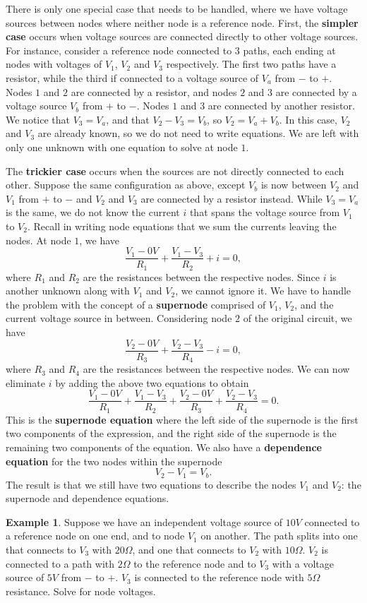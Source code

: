 \documentclass[11pt]{article}
\theoremstyle{plain} %
\theoremstyle{definition}
\theoremstyle{example}
\newtheorem*{example}{Example}
\theoremstyle{remark}
\begin{document}
There is only one special case that needs to be handled, where we have voltage sources between nodes where neither node is a reference node. First, the \textbf{simpler case} occurs when voltage sources are connected directly to other voltage sources. For instance, consider a reference node connected to 3 paths, each ending at nodes with voltages of $V_1$, $V_2$ and $V_3$ respectively. The first two paths have a resistor, while the third if connected to a voltage source of $V_a$ from $-$ to $+$. Nodes $1$ and $2$ are connected by a resistor, and nodes $2$ and $3$ are connected by a voltage source $V_b$ from $+$ to $-$. Nodes $1$ and $3$ are connected by another resistor. We notice that $V_3 = V_a$, and that $V_2-V_3 = V_b$, so $V_2 = V_a + V_b$. In this case, $V_2$ and $V_3$ are already known, so we do not need to write equations. We are left with only one unknown with one equation to solve at node $1$. 

The \textbf{trickier case} occurs when the sources are not directly connected to each other. Suppose the same configuration as above, except $V_b$ is now between $V_2$ and $V_1$ from $+$ to $-$ and $V_2$ and $V_3$ are connected by a resistor instead. While $V_3 = V_a$ is the same, we do not know the current $i$ that spans the voltage source from $V_1$ to $V_2$. Recall in writing node equations that we sum the currents leaving the nodes. At node $1$, we have 
$$\frac{V_1-0V}{R_1} + \frac{V_1-V_3}{R_2} + i = 0,$$
where $R_1$ and $R_2$ are the resistances between the respective nodes. Since $i$ is another unknown along with $V_1$ and $V_2$, we cannot ignore it. We have to handle the problem with the concept of a \textbf{supernode} comprised of $V_1$, $V_2$, and the current voltage source in between. Considering node $2$ of the original circuit, we have 
$$\frac{V_2-0V}{R_3} + \frac{V_2-V_3}{R_4} - i = 0,$$
where $R_3$ and $R_4$ are the resistances between the respective nodes. We can now eliminate $i$ by adding the above two equations to obtain 
$$\frac{V_1-0V}{R_1} + \frac{V_1-V_3}{R_2} +\frac{V_2-0V}{R_3} + \frac{V_2-V_3}{R_4}=0.$$
This is the \textbf{supernode equation} where the left side of the supernode is the first two components of the expression, and the right side of the supernode is the remaining two components of the equation. We also have a \textbf{dependence equation} for the two nodes within the supernode
$$V_2-V_1 = V_b.$$
The result is that we still have two equations to describe the nodes $V_1$ and $V_2$: the supernode and dependence equations. 

\begin{example}
Suppose we have an independent voltage source of $10V$ connected to a reference node on one end, and to node $V_1$ on another. The path splits into one that connects to $V_3$ with $20\Omega$, and one that connects to $V_2$ with $10\Omega$. $V_2$ is connected to a path with $2\Omega$ to the reference node and to $V_3$ with a voltage source of $5V$ from $-$ to $+$. $V_3$ is connected to the reference node with $5\Omega$ resistance. Solve for node voltages. 
\end{example}
\end{document}
